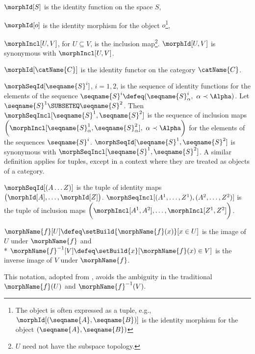 \documentclass{article}
\begin{document}
\begin{definition}[Identity]
\label{def:Id}
$\morphId[S]$ is the identity function on the space $S$,

$\morphId[o]$ is the
identity morphism for the object $o$\footnote{
The object is often expressed as a tuple, e.g.,
$\morphId[{{(\seqname{A}, \seqname{B})}}]$ is the identity morphism for the
object $(\seqname{A}, \seqname{B})$
},

$\morphIncl[U,V]$, for $U \subseteq V$, is the inclusion map\footnote{
$U$ need not have the subspace topology.
}.
$\morphId[{{U,V}}]$ is synonymous with $\morphIncl[U,V]$.

$\morphId[\catName{C}]$ is the identity functor on the category $\catName{C}$.

$\morphSeqId[\seqname{S}^i]$, $i=1,2$, is the sequence of identity functions
for the elements of the sequence
$\seqname{S}^i \defeq (\seqname{S}^i_\alpha,~ \alpha \prec \Alpha)$. Let
$\seqname{S}^1 \SUBSETEQ \seqname{S}^2$. Then
$\morphSeqIncl[\seqname{S}^1,\seqname{S}^2]$ is the sequence of inclusion maps
$
  \biggl (
    \morphIncl[\seqname{S}^1_\alpha,\seqname{S}^2_\alpha],~\alpha \prec \Alpha
  \biggr )
$
for the elements of the sequences $\seqname{S}^i$.
$\morphSeqId[{{\seqname{S}^1,\seqname{S}^2}}]$ is synonymous with
$\morphSeqIncl[\seqname{S}^1,\seqname{S}^2]$.  A similar definition applies for
tuples, except in a context where they are treated as objects of a
category.

$\morphSeqId[{{(A \dots Z)}}]$ is the tuple of identity maps
$\bigl (\morphId[A], \dots, \morphId[Z] \bigr)$.
$\morphSeqIncl[{(A^1, \dots, Z^1)},{(A^2, \dots, Z^2)}]$ is the tuple of inclusion maps
$\biggl ( \morphIncl[A^1, A^2], \dots, \morphIncl[Z^1, Z^2] \biggr )$.
\end{definition}

\begin{definition}[Images]
$\morphName{f} [U] \defeq \setBuild { {\morphName{f}(x)} }[x \in U]$ is the
image of $U$ under $\morphName{f}$ and \\*
$\morphName{f}^{-1} [V] \defeq \setBuild {x}[\morphName{f}(x) \in V]$ is the
inverse image of $V$ under $\morphName{f}$.

\begin{remark}
  This notation, adopted from \cite{GenTop}, avoids the ambiguity in
  the traditional $\morphName{f}(U)$ and $\morphName{f}^{-1}(V)$.
\end{remark}
\end{definition}
\end{document}
